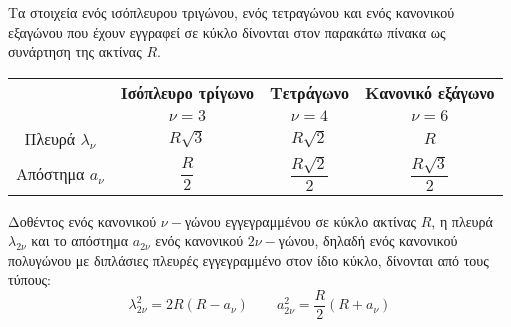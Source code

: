 \documentclass[twoside,nofonts,internet,shmeiwseis]{thewria}
\begin{document}
\thewrhmata
{}
Τα στοιχεία ενός ισόπλευρου τριγώνου, ενός τετραγώνου και ενός κανονικού εξαγώνου που έχουν εγγραφεί σε κύκλο δίνονται στον παρακάτω πίνακα ως συνάρτηση της ακτίνας $ R $.
\begin{center}\begin{tabular}{c|c|c|c}
\hline \rule[-2ex]{0pt}{5ex}
 & \textbf{Ισόπλευρο τρίγωνο} & \textbf{Τετράγωνο} & \textbf{Κανονικό εξάγωνο} \\ 
 & {\boldmath$ \nu=3 $} & {\boldmath$ \nu=4 $} & {\boldmath$ \nu=6 $} \\
\hhline{====} \rule[-2ex]{0pt}{5ex}
Πλευρά $ \lambda_\nu $ & $ R\sqrt{3} $ & $ R\sqrt{2} $ & $ R $ \\ 
\rule[-2ex]{0pt}{5ex}
Απόστημα $ a_\nu $ & $ \dfrac{R}{2} $ & $ \dfrac{R\sqrt{2}}{2} $ & $ \dfrac{R\sqrt{3}}{2} $ \\ 
\hline 
\end{tabular} 
\end{center} 
Δοθέντος ενός κανονικού $ \nu- $γώνου εγγεγραμμένου σε κύκλο ακτίνας $ R $, η πλευρά $ \lambda_{2\nu} $ και το απόστημα $ a_{2\nu} $ ενός κανονικού $ 2\nu- $γώνου, δηλαδή ενός κανονικού πολυγώνου με διπλάσιες πλευρές εγγεγραμμένο στον ίδιο κύκλο, δίνονται από τους τύπους:
\[ \lambda_{2\nu}^2=2R(R-a_\nu)\qquad a_{2\nu}^2=
\frac{R}{2}(R+a_\nu) \]
\end{document}

